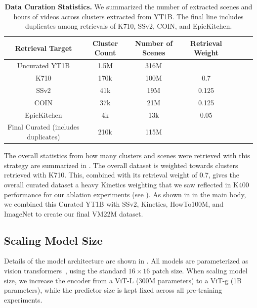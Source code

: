 \documentclass[]{fairmeta}
\begin{document}
\begin{table}[h]
    \centering
    \small
    \caption{
      \textbf{Data Curation Statistics.} We summarized the number of extracted scenes and hours of videos across clusters extracted from YT1B. The final line includes duplicates among retrievals of K710, SSv2, COIN, and EpicKitchen.}
    \begin{tabular}{ccccccc}
    \toprule
    Retrieval Target & Cluster Count & Number of Scenes & Retrieval Weight  \\
    \midrule
    Uncurated YT1B & 1.5M & 316M  \\
    \midrule
    K710 & 170k & 100M &  0.7 \\
    SSv2 & 41k & 19M &  0.125 \\
    COIN & 37k & 21M &  0.125 \\
    EpicKitchen & 4k &  13k & 0.05 \\
    \midrule
    Final Curated (includes duplicates) & 210k & 115M
    \end{tabular}
    \label{table:retrieval_stats}
\end{table}
The overall statistics from how many clusters and scenes were retrieved with this strategy are summarized in .
The overall dataset is weighted towards clusters retrieved with K710. This, combined with its retrieval weight of 0.7, gives the overall curated dataset a heavy Kinetics weighting that we saw reflected in K400 performance for our ablation experiments (see ).
As shown in  in the main body, we combined this Curated YT1B with SSv2, Kinetics, HowTo100M, and ImageNet to create our final VM22M dataset.

\subsection{Scaling Model Size}

Details of the model architecture are shown in . All models are parameterized as vision transformers~\cite{dosovitskiy2020image}, using the standard $16 \times 16$ patch size. When scaling model size, we increase the encoder from a ViT-L (300M parameters) to a ViT-g (1B parameters), while the predictor size is kept fixed across all pre-training experiments.
\end{document}
